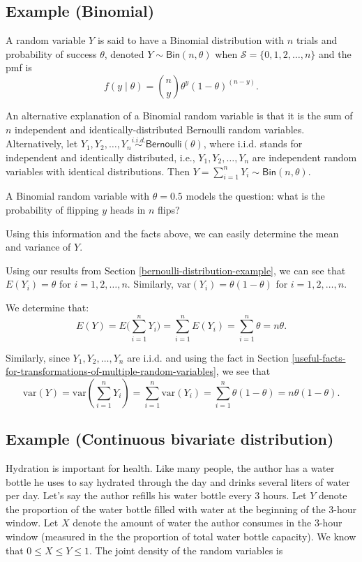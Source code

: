 \documentclass[
]{book}
\theoremstyle{definition}
\theoremstyle{definition}
\theoremstyle{definition}
\theoremstyle{definition}
\theoremstyle{remark}
\begin{document}
\hypertarget{example-binomial}{%
\subsection{Example (Binomial)}\label{example-binomial}}

A random variable \(Y\) is said to have a Binomial distribution with \(n\) trials and probability of success \(\theta\), denoted \(Y\sim \mathsf{Bin}(n,\theta)\) when \(\mathcal{S}=\{0,1,2,\ldots,n\}\) and the pmf is
\[f(y\mid\theta) = \binom{n}{y} \theta^y (1-\theta)^{(n-y)}.\]

An alternative explanation of a Binomial random variable is that it is the sum of \(n\) independent and identically-distributed Bernoulli random variables. Alternatively, let \(Y_1,Y_2,\ldots,Y_n\stackrel{i.i.d.}{\sim} \mathsf{Bernoulli}(\theta)\), where i.i.d. stands for independent and identically distributed, i.e., \(Y_1, Y_2, \ldots, Y_n\) are independent random variables with identical distributions. Then \(Y=\sum_{i=1}^n Y_i \sim \mathsf{Bin}(n,\theta)\).

A Binomial random variable with \(\theta = 0.5\) models the question: what is the probability of flipping \(y\) heads in \(n\) flips?

Using this information and the facts above, we can easily determine the mean and variance of \(Y\).

Using our results from Section \ref{bernoulli-distribution-example}, we can see that \(E(Y_i) = \theta\) for \(i=1,2,\ldots,n\). Similarly, \(\mathrm{var}(Y_i)=\theta(1-\theta)\) for \(i=1,2,\ldots,n\).

We determine that:
\[
E(Y)=E\biggl(\sum_{i=1}^n Y_i\biggr)=\sum_{i=1}^n E(Y_i) = \sum_{i=1}^n \theta = n\theta.
\]

Similarly, since \(Y_1, Y_2, \ldots, Y_n\) are i.i.d. and using the fact in Section \ref{useful-facts-for-transformations-of-multiple-random-variables}, we see that
\[
\mathrm{var}(Y) = \mathrm{var}(\sum_{i=1}^n Y_i) = \sum_{i=1}^n\mathrm{var}(Y_i)=\sum_{i=1}^n \theta(1-\theta) = n\theta(1-\theta).
\]

\hypertarget{example-continuous-bivariate-distribution}{%
\subsection{Example (Continuous bivariate distribution)}\label{example-continuous-bivariate-distribution}}

Hydration is important for health. Like many people, the author has a water bottle he uses to say hydrated through the day and drinks several liters of water per day. Let's say the author refills his water bottle every 3 hours. Let \(Y\) denote the proportion of the water bottle filled with water at the beginning of the 3-hour window. Let \(X\) denote the amount of water the author consumes in the 3-hour window (measured in the the proportion of total water bottle capacity). We know that \(0\leq X \leq Y \leq 1\). The joint density of the random variables is
\end{document}
